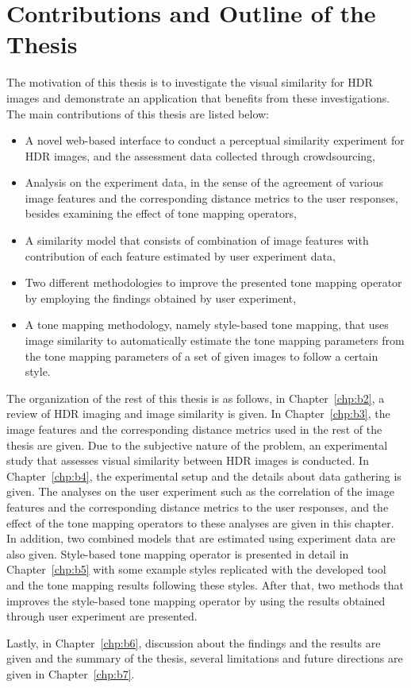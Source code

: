 \section{Contributions and Outline of the Thesis}
The motivation of this thesis is to investigate the visual similarity for HDR images and demonstrate an application that benefits from these investigations. The main contributions of this thesis are listed below: 
\begin{itemize}
    \item A novel web-based interface to conduct a perceptual similarity experiment for HDR images, and the assessment data collected through crowdsourcing,
    \item Analysis on the experiment data, in the sense of the agreement of various image features and the corresponding distance metrics to the user responses, besides examining the effect of tone mapping operators,
    \item A similarity model that consists of combination of image features with contribution of each feature estimated by user experiment data,
    \item Two different methodologies to improve the presented tone mapping operator by employing the findings obtained by user experiment,
    \item A tone mapping methodology, namely style-based tone mapping, that uses image similarity to automatically estimate the tone mapping parameters from the tone mapping parameters of a set of given images to follow a certain style.
\end{itemize}
The organization of the rest of this thesis is as follows, in Chapter~\ref{chp:b2}, a review of HDR imaging and image similarity is given. In Chapter~\ref{chp:b3}, the image features and the corresponding distance metrics used in the rest of the thesis are given. Due to the subjective nature of the problem, an experimental study that assesses visual similarity between HDR images is conducted. In Chapter~\ref{chp:b4}, the experimental setup and the details about data gathering is given. The analyses on the user experiment such as the correlation of the image features and the corresponding distance metrics to the user responses, and the effect of the tone mapping operators to these analyses are given in this chapter. In addition, two combined models that are estimated using experiment data are also given. Style-based tone mapping operator is presented in detail in Chapter~\ref{chp:b5} with some example styles replicated with the developed tool and the tone mapping results following these styles. After that, two methods that improves the style-based tone mapping operator by using the results obtained through user experiment are presented. 

Lastly, in Chapter~\ref{chp:b6}, discussion about the findings and the results are given and the summary of the thesis, several limitations and future directions are given in Chapter~\ref{chp:b7}.






